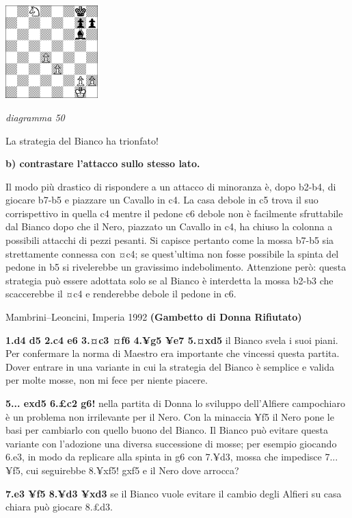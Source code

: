 \documentclass[
]{article}
\begin{document}
\includegraphics[width=1.40972in,height=1.40972in]{vertopal_109f12be458a423d8f3cc838880eaea2/media/image50.png}

\emph{diagramma 50}

La strategia del Bianco ha trionfato!

\textbf{b) contrastare l'attacco sullo stesso lato.}

Il modo più drastico di rispondere a un attacco di minoranza è, dopo
b2-b4, di giocare b7-b5 e piazzare un Cavallo in c4. La casa debole in
c5 trova il suo corrispettivo in quella c4 mentre il pedone c6 debole
non è facilmente sfruttabile dal Bianco dopo che il Nero, piazzato un
Cavallo in c4, ha chiuso la colonna a possibili attacchi di pezzi
pesanti. Si capisce pertanto come la mossa b7-b5 sia strettamente
connessa con ¤c4; se quest'ultima non fosse possibile la spinta del
pedone in b5 si rivelerebbe un gravissimo indebolimento. Attenzione
però: questa strategia può essere adottata solo se al Bianco è
interdetta la mossa b2-b3 che scaccerebbe il ¤c4 e renderebbe debole il
pedone in c6.

Mambrini--Leoncini, Imperia 1992 \textbf{(Gambetto di Donna Rifiutato)}

\textbf{1.d4 d5 2.c4 e6 3.¤c3 ¤f6 4.¥g5 ¥e7 5.¤xd5} il Bianco svela i
suoi piani. Per confermare la norma di Maestro era importante che
vincessi questa partita. Dover entrare in una variante in cui la
strategia del Bianco è semplice e valida per molte mosse, non mi fece
per niente piacere.

\textbf{5... exd5 6.£c2 g6!} nella partita di Donna lo sviluppo
dell'Alfiere campochiaro è un problema non irrilevante per il Nero. Con
la minaccia ¥f5 il Nero pone le basi per cambiarlo con quello buono del
Bianco. Il Bianco può evitare questa variante con l'adozione una diversa
successione di mosse; per esempio giocando 6.e3, in modo da replicare
alla spinta in g6 con 7.¥d3, mossa che impedisce 7... ¥f5, cui
seguirebbe 8.¥xf5! gxf5 e il Nero dove arrocca?

\textbf{7.e3 ¥f5 8.¥d3 ¥xd3} se il Bianco vuole evitare il cambio degli
Alfieri su casa chiara può giocare 8.£d3.
\end{document}
